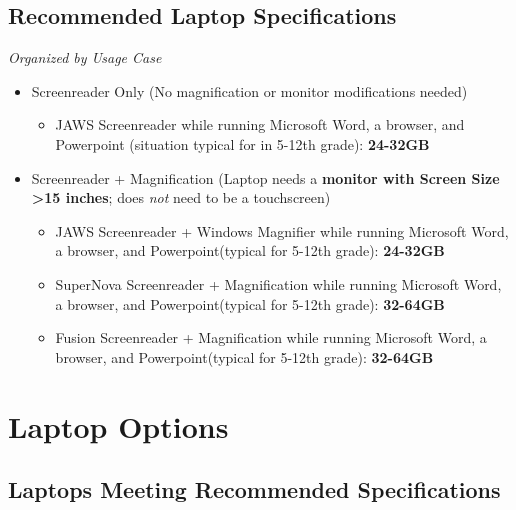 \documentclass[14pt, letterpaper,twoside]{extreport}
\begin{document}
\pagebreak \hypertarget{minimum-laptop-recommendations}{%
\section*{Recommended Laptop Specifications}\label{minimum-laptop-recommendations}}

\emph{Organized by Usage Case}

\begin{itemize}
\item
 Screenreader Only (No magnification or monitor modifications needed)

 \begin{itemize}
 
 \item
 JAWS Screenreader while running Microsoft Word, a browser, and Powerpoint (situation typical for in 5-12th grade): \textbf{24-32GB}
 \end{itemize}
\item
 Screenreader + Magnification (Laptop needs a \textbf{monitor with Screen Size \textgreater15 inches}; does \emph{not} need to be a touchscreen)

 \begin{itemize}
 
 \item
 JAWS Screenreader + Windows Magnifier while running Microsoft Word, a browser, and Powerpoint(typical for 5-12th grade): \textbf{24-32GB}
 \item
 SuperNova Screenreader + Magnification while running Microsoft Word, a browser, and Powerpoint(typical for 5-12th grade): \textbf{32-64GB}
 \item
 Fusion Screenreader + Magnification while running Microsoft Word, a browser, and Powerpoint(typical for 5-12th grade): \textbf{32-64GB}
 \end{itemize}
\end{itemize}

\pagebreak \hypertarget{laptop-options}{%
\chapter*{Laptop Options}\label{laptop-options}}

\hypertarget{laptops-meeting-redcommended-specifications}{%
\section*{Laptops Meeting Recommended
Specifications}\label{laptops-meeting-redcommended-specifications}}
\end{document}
